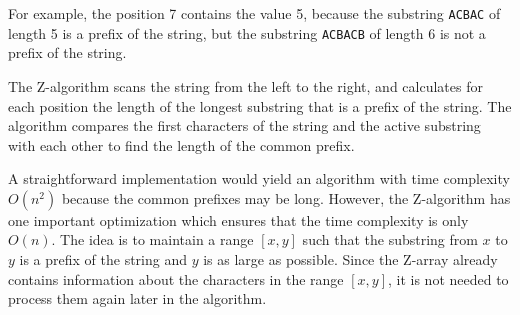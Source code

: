 \begin{center}
\end{center}

For example, the position 7 contains the value 5,
because the substring \texttt{ACBAC} of length 5
is a prefix of the string,
but the substring \texttt{ACBACB} of length 6
is not a prefix of the string.

The Z-algorithm scans the string from the left
to the right, and calculates for each position
the length of the longest substring that
is a prefix of the string.
The algorithm compares the first characters
of the string
and the active substring with each other to
find the length of the common prefix.

A straightforward implementation would yield
an algorithm with time complexity $O(n^2)$
because the common prefixes may be long.
However, the Z-algorithm has one important
optimization which ensures that the time complexity
is only $O(n)$.
The idea is to maintain a range $[x,y]$ such that
the substring from $x$ to $y$ is a prefix of
the string and $y$ is as large as possible.
Since the Z-array already contains information
about the characters in the range $[x,y]$,
it is not needed to process them again later in the algorithm.

